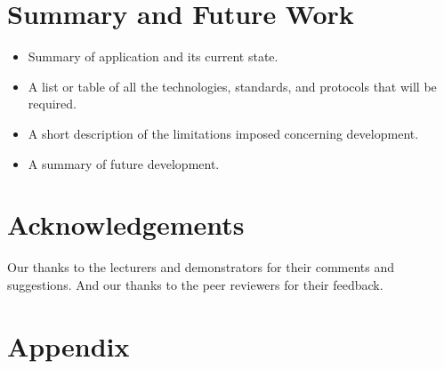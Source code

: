\documentclass{sig-alt-release2}
\begin{document}



\section{Summary and Future Work}
\begin{itemize}
\item	Summary of application and its current state.
\item	A list or table of all the technologies, standards, and protocols that will be required.
\item	A short description of the limitations imposed concerning development.
\item   A summary of future development.
\end{itemize}

\section{Acknowledgements}
Our thanks to the lecturers and demonstrators for their comments and suggestions. 
And our thanks to the peer reviewers for their feedback. 




\section{Appendix}

\end{document}
